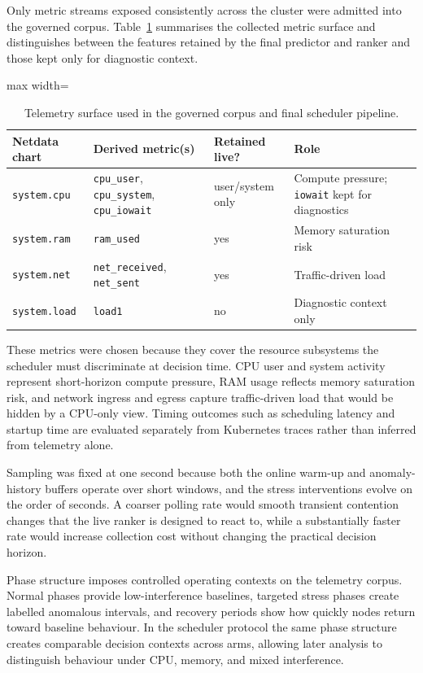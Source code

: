 Only metric streams exposed consistently across the cluster were admitted into the governed corpus. Table~\ref{tab:ch2-telemetry-surface} summarises the collected metric surface and distinguishes between the features retained by the final predictor and ranker and those kept only for diagnostic context.

\begin{table}[h]
\centering
\small
\begin{adjustbox}{max width=\textwidth}
\begin{tabular}{llll}
\hline
\textbf{Netdata chart} & \textbf{Derived metric(s)} & \textbf{Retained live?} & \textbf{Role} \\
\hline
\texttt{system.cpu} & \texttt{cpu\_user}, \texttt{cpu\_system}, \texttt{cpu\_iowait} & user/system only & Compute pressure; \texttt{iowait} kept for diagnostics \\
\texttt{system.ram} & \texttt{ram\_used} & yes & Memory saturation risk \\
\texttt{system.net} & \texttt{net\_received}, \texttt{net\_sent} & yes & Traffic-driven load \\
\texttt{system.load} & \texttt{load1} & no & Diagnostic context only \\
\hline
\end{tabular}
\end{adjustbox}
\caption{Telemetry surface used in the governed corpus and final scheduler pipeline.}
\label{tab:ch2-telemetry-surface}
\end{table}

These metrics were chosen because they cover the resource subsystems the scheduler must discriminate at decision time. CPU user and system activity represent short-horizon compute pressure, RAM usage reflects memory saturation risk, and network ingress and egress capture traffic-driven load that would be hidden by a CPU-only view. Timing outcomes such as scheduling latency and startup time are evaluated separately from Kubernetes traces rather than inferred from telemetry alone.

Sampling was fixed at one second because both the online warm-up and anomaly-history buffers operate over short windows, and the stress interventions evolve on the order of seconds. A coarser polling rate would smooth transient contention changes that the live ranker is designed to react to, while a substantially faster rate would increase collection cost without changing the practical decision horizon.

Phase structure imposes controlled operating contexts on the telemetry corpus. Normal phases provide low-interference baselines, targeted stress phases create labelled anomalous intervals, and recovery periods show how quickly nodes return toward baseline behaviour. In the scheduler protocol the same phase structure creates comparable decision contexts across arms, allowing later analysis to distinguish behaviour under CPU, memory, and mixed interference.

